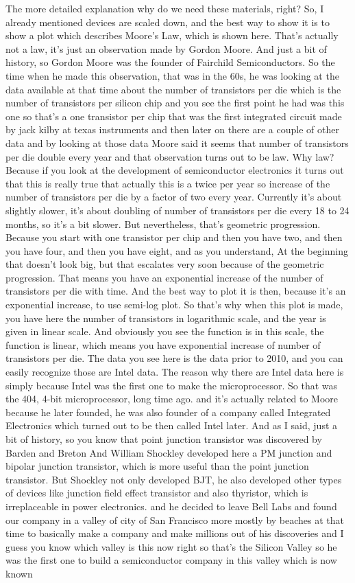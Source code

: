 The more detailed explanation why do we need these materials, right? So, I already mentioned devices are scaled down, and the best way to show it is to show a plot which describes Moore's Law, which is shown here. That's actually not a law, it's just an observation made by Gordon Moore. And just a bit of history, so Gordon Moore was the founder of Fairchild Semiconductors. So the time when he made this observation, that was in the 60s, he was looking at the data available at that time about the number of transistors per die which is the number of transistors per silicon chip and you see the first point he had was this one so that's a one transistor per chip that was the first integrated circuit made by jack kilby at texas instruments and then later on there are a couple of other data and by looking at those data Moore said it seems that number of transistors per die double every year and that observation turns out to be law. Why law? Because if you look at the development of semiconductor electronics it turns out that this is really true that actually this is a twice per year so increase of the number of transistors per die by a factor of two every year. Currently it's about slightly slower, it's about doubling of number of transistors per die every 18 to 24 months, so it's a bit slower. But nevertheless, that's geometric progression. Because you start with one transistor per chip and then you have two, and then you have four, and then you have eight, and as you understand, At the beginning that doesn't look big, but that escalates very soon because of the geometric progression. That means you have an exponential increase of the number of transistors per die with time. And the best way to plot it is then, because it's an exponential increase, to use semi-log plot. So that's why when this plot is made, you have here the number of transistors in logarithmic scale, and the year is given in linear scale. And obviously you see the function is in this scale, the function is linear, which means you have exponential increase of number of transistors per die. The data you see here is the data prior to 2010, and you can easily recognize those are Intel data. The reason why there are Intel data here is simply because Intel was the first one to make the microprocessor. So that was the 404, 4-bit microprocessor, long time ago. and it's actually related to Moore because he later founded, he was also founder of a company called Integrated Electronics which turned out to be then called Intel later. And as I said, just a bit of history, so you know that point junction transistor was discovered by Barden and Breton And William Shockley developed here a PM junction and bipolar junction transistor, which is more useful than the point junction transistor. But Shockley not only developed BJT, he also developed other types of devices like junction field effect transistor and also thyristor, which is irreplaceable in power electronics. and he decided to leave Bell Labs and found our company in a valley of city of San Francisco more mostly by beaches at that time to basically make a company and make millions out of his discoveries and I guess you know which valley is this now right so that's the Silicon Valley so he was the first one to build a semiconductor company in this valley which is now known 